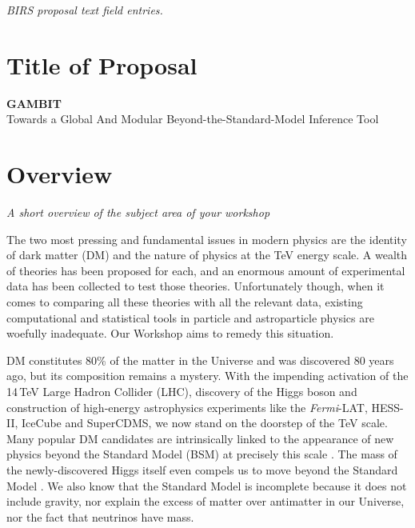 \documentclass[a4paper,11pt]{article}
\newenvironment{xcomment}{\em}{}
\begin{document}
\begin{xcomment}
\noindent BIRS proposal text field entries.
\end{xcomment}

\section{Title of Proposal}
\textbf{GAMBIT}\\
Towards a Global And Modular Beyond-the-Standard-Model Inference Tool

\section{Overview}
\begin{xcomment}
A short overview of the subject area of your workshop
\end{xcomment}

The two most pressing and fundamental issues in modern physics are the identity of dark matter (DM) and the nature of physics at the TeV energy scale.  A wealth of theories has been proposed for each, and an enormous amount of experimental data has been collected to test those theories.  Unfortunately though, when it comes to comparing all these theories with all the relevant data, existing computational and statistical tools in particle and astroparticle physics are woefully inadequate.  Our Workshop aims to remedy this situation.

DM constitutes 80\% of the matter in the Universe and was discovered 80 years ago, but its composition remains a mystery.  With the impending activation of the 14\,TeV Large Hadron Collider (LHC), discovery of the Higgs boson and construction of high-energy astrophysics experiments like the \textit{Fermi}-LAT, HESS-II, IceCube and SuperCDMS, we now stand on the doorstep of the TeV scale.  Many popular DM candidates are intrinsically linked to the appearance of new physics beyond the Standard Model (BSM) at precisely this scale \cite{Bertone05}.  The mass of the newly-discovered Higgs itself even compels us to move beyond the Standard Model \cite{BaerTata, Degrassi12}.  We also know that the Standard Model is incomplete because it does not include gravity, nor explain the excess of matter over antimatter in our Universe, nor the fact that neutrinos have mass.
\end{document}
